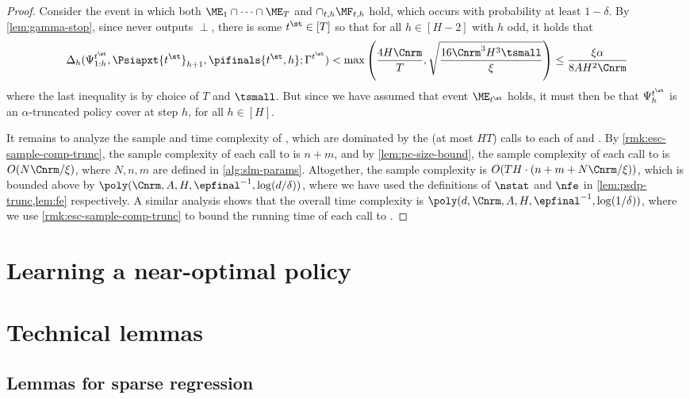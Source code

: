 \documentclass[11pt, oneside]{article}
\theoremstyle{plain}
\theoremstyle{definition}
\numberwithin{theorem}{section}
\renewcommand{\^}[1]{^{(#1)}}
\begin{document}
\begin{proof}
  Consider the event in which both $\ME_1\cap\dots\cap\ME_T$ and $\cap_{t,h} \MF_{t,h}$ hold, which occurs with probability at least $1-\delta$. By \cref{lem:gamma-stop}, since \ESCt never outputs $\perp$, there is some $t^\st \in [T]$ so that for all $h \in [H-2]$ with $h$ odd, it holds that \[\Delta_h(\Psi_{1:h}^{t^\st}, \Psiapxt{t^\st}_{h+1}, \pifinals{t^\st,h};\Gamma^{t^\st}) < \max\left(\frac{4H\Cnrm}{T},\sqrt{\frac{16\Cnrm^3 H^3\tsmall}{\xi}}\right) \leq \frac{\xi\alpha}{8AH^2 \Cnrm}\]
  where the last inequality is by choice of $T$ and $\tsmall$. But since we have assumed that event $\ME_{t^\st}$ holds, it must then be that $\Psi_h^{t^\st}$ is an $\alpha$-truncated policy cover at step $h$, for all $h \in [H]$.

  It remains to analyze the sample and time complexity of \SLMt{}, which are dominated by the (at most $HT$) calls to each of \ESCt{} and \PC. By \cref{rmk:esc-sample-comp-trunc}, the sample complexity of each call to \ESCt{} is $n+m$, and by \cref{lem:pc-size-bound}, the sample complexity of each call to \PC is $O(N \Cnrm/\xi)$, where $N,n,m$ are defined in  \cref{alg:slm-params}. Altogether, the sample complexity is $O(TH \cdot (n + m + N\Cnrm/\xi))$, which is bounded above by $\poly(\Cnrm, A, H, \epfinal^{-1}, \log(d/\delta))$, where we have used the definitions of $\nstat$ and $\nfe$ in \cref{lem:psdp-trunc,lem:fe} respectively. A similar analysis shows that the overall time complexity is $\poly(d, \Cnrm, A, H, \epfinal^{-1}, \log(1/\delta))$, where we use \cref{rmk:esc-sample-comp-trunc} to bound the running time of each call to \ESCt{}. 
\end{proof}





\section{Learning a near-optimal policy}\label{sec:learning}







\appendix

\section{Technical lemmas}

\subsection{Lemmas for sparse regression}\label{sec:sparse-regression-lemmas}

\end{document}
